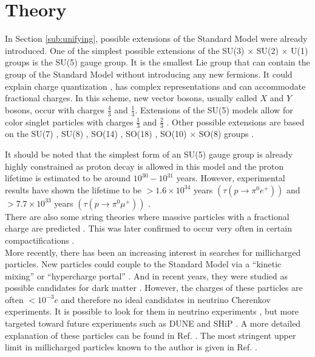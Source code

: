 \section{Theory}
In Section \ref{sub:unifying}, possible extensions of the Standard Model were already introduced. One of the simplest possible extensions of the SU(3) $\times$ SU(2) $\times$ U(1) groups is the SU(5) gauge group. It is the smallest Lie group that can contain the group of the Standard Model without introducing any new fermions. It could explain charge quantization \cite{He:1989eq}, has complex representations and can accommodate fractional charges. In this scheme, new vector bosons, usually called $X$ and $Y$ bosons, occur with charges $\frac{4}{3}$ and $\frac{1}{3}$. Extensions of the SU(5) models allow for color singlet particles with charges $\frac{1}{3}$ and $\frac{2}{3}$ \cite{Barr:1982vj}. Other possible extensions are based on the SU(7) \cite{Frampton:1982gc}, SU(8) \cite{Yu:1984pb}, SO(14) \cite{Yamamoto:1982sk}, SO(18) \cite{Dong:1983nh}, SO(10) $\times$ SO(8) groups \cite{Jiang:1985jy}. 

It should be noted that the simplest form of an SU(5) gauge group is already highly constrained as proton decay is allowed in this model and the proton lifetime is estimated to be around $10^{30}-10^{31}$ years. However, experimental results have shown the lifetime to be $>1.6 \times 10^{34}$ years $\left(\tau\left(p \rightarrow \pi^0 e^+\right)\right)$ and $>7.7 \times 10^{33}$ years $\left(\tau\left(p \rightarrow \pi^0 \mu^+\right)\right)$ \cite{Miura:2016krn}.\\
\newline
There are also some string theories where massive particles with a fractional charge are predicted \cite{Wen:1985qj,Antoniadis:1992eb}. This was later confirmed to occur very often in certain compactifications \cite{Athanasiu:1988uj}.\\

\noindent More recently, there has been an increasing interest in searches for millicharged particles. New particles could couple to the Standard Model via a ``kinetic mixing'' or ``hypercharge portal'' \cite{Holdom:1985ag,Izaguirre:2015eya}. And in recent years, they were studied as possible candidates for dark matter \cite{Brahm:1989jh,Boehm:2003hm,Pospelov:2007mp,Bjorken:2009mm}. However, the charges of these particles are often $<10^{-3}e$ and therefore no ideal candidates in neutrino Cherenkov experiments. It is possible to look for them in neutrino experiments \cite{Magill:2018tbb}, but more targeted toward future experiments such as DUNE \cite{Acciarri:2015uup} and SHiP \cite{Anelli:2015pba}. A more detailed explanation of these particles can be found in Ref. \cite{Battaglieri:2017aum}. The most stringent upper limit in millicharged particles known to the author is given in Ref. \cite{Alvis:2018yte}.\\

